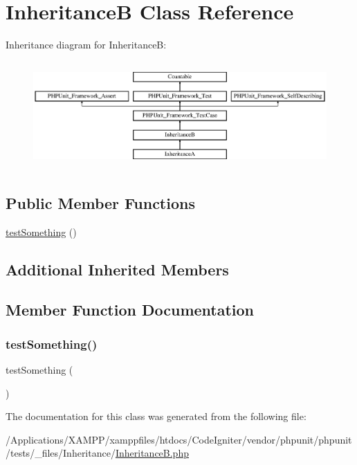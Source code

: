 \hypertarget{class_inheritance_b}{}\section{InheritanceB Class Reference}
\label{class_inheritance_b}
Inheritance diagram for InheritanceB\+:\begin{figure}[H]
\begin{center}
\leavevmode
\includegraphics[height=4.129793cm]{class_inheritance_b}
\end{center}
\end{figure}
\subsection*{Public Member Functions}
\begin{DoxyCompactItemize}
\item 
\mbox{\hyperlink{class_inheritance_b_a0fc4e17369bc9607ebdd850d9eda8167}{test\+Something}} ()
\end{DoxyCompactItemize}
\subsection*{Additional Inherited Members}


\subsection{Member Function Documentation}
\mbox{\label{class_inheritance_b_a0fc4e17369bc9607ebdd850d9eda8167}} 
\subsubsection{\texorpdfstring{test\+Something()}{testSomething()}}
{\footnotesize\ttfamily test\+Something (\begin{DoxyParamCaption}{ }\end{DoxyParamCaption})}



The documentation for this class was generated from the following file\+:\begin{DoxyCompactItemize}
\item 
/\+Applications/\+X\+A\+M\+P\+P/xamppfiles/htdocs/\+Code\+Igniter/vendor/phpunit/phpunit/tests/\+\_\+files/\+Inheritance/\mbox{\hyperlink{_inheritance_b_8php}{Inheritance\+B.\+php}}\end{DoxyCompactItemize}
